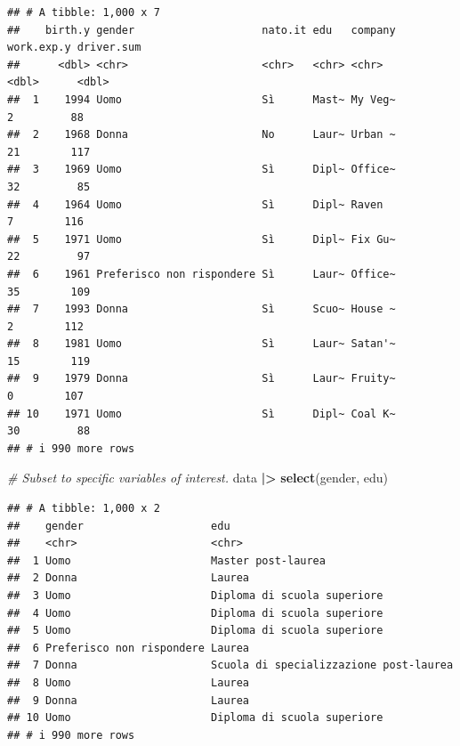 \documentclass[
]{book}
\newenvironment{Shaded}{\begin{snugshade}}{\end{snugshade}}
\newcommand{\CommentTok}[1]{\textcolor[rgb]{0.56,0.35,0.01}{\textit{#1}}}
\newcommand{\FunctionTok}[1]{\textcolor[rgb]{0.13,0.29,0.53}{\textbf{#1}}}
\newcommand{\NormalTok}[1]{#1}
\newcommand{\SpecialCharTok}[1]{\textcolor[rgb]{0.81,0.36,0.00}{\textbf{#1}}}
\begin{document}
\begin{verbatim}
## # A tibble: 1,000 x 7
##    birth.y gender                    nato.it edu   company work.exp.y driver.sum
##      <dbl> <chr>                     <chr>   <chr> <chr>        <dbl>      <dbl>
##  1    1994 Uomo                      Sì      Mast~ My Veg~          2         88
##  2    1968 Donna                     No      Laur~ Urban ~         21        117
##  3    1969 Uomo                      Sì      Dipl~ Office~         32         85
##  4    1964 Uomo                      Sì      Dipl~ Raven            7        116
##  5    1971 Uomo                      Sì      Dipl~ Fix Gu~         22         97
##  6    1961 Preferisco non rispondere Sì      Laur~ Office~         35        109
##  7    1993 Donna                     Sì      Scuo~ House ~          2        112
##  8    1981 Uomo                      Sì      Laur~ Satan'~         15        119
##  9    1979 Donna                     Sì      Laur~ Fruity~          0        107
## 10    1971 Uomo                      Sì      Dipl~ Coal K~         30         88
## # i 990 more rows
\end{verbatim}

\begin{Shaded}
\begin{Highlighting}[]
\CommentTok{\# Subset to specific variables of interest.}
\NormalTok{data }\SpecialCharTok{|\textgreater{}} 
  \FunctionTok{select}\NormalTok{(gender, edu)}
\end{Highlighting}
\end{Shaded}

\begin{verbatim}
## # A tibble: 1,000 x 2
##    gender                    edu                                   
##    <chr>                     <chr>                                 
##  1 Uomo                      Master post-laurea                    
##  2 Donna                     Laurea                                
##  3 Uomo                      Diploma di scuola superiore           
##  4 Uomo                      Diploma di scuola superiore           
##  5 Uomo                      Diploma di scuola superiore           
##  6 Preferisco non rispondere Laurea                                
##  7 Donna                     Scuola di specializzazione post-laurea
##  8 Uomo                      Laurea                                
##  9 Donna                     Laurea                                
## 10 Uomo                      Diploma di scuola superiore           
## # i 990 more rows
\end{verbatim}
\end{document}
